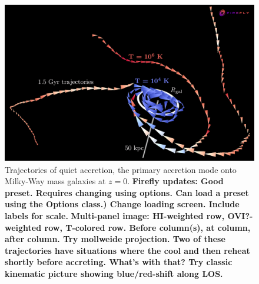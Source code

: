 \documentclass[fleqn,usenatbib]{mnras}
\begin{document}
\begin{figure}
    \centering
    \includegraphics[width=\textwidth]{figures/illustrative_tracks/illustrative_tracks.png}
    \caption{
Trajectories of quiet accretion, the primary accretion mode onto Milky-Way mass galaxies at $z=0$.
    \textbf{
    Firefly updates:
Good preset. Requires changing using options. Can load a preset using the Options class.)
Change loading screen.
Include labels for scale.
}
    \textbf{
    Multi-panel image:
    HI-weighted row,
    OVI?-weighted row,
    T-colored row.
    Before column(s), at column, after column.
    Try mollweide projection.
    Two of these trajectories have situations where the cool and then reheat shortly before accreting. What's with that?
    Try classic kinematic picture showing blue/red-shift along LOS.
    }
    }
    \label{f: overview}
\end{figure}
\end{document}
